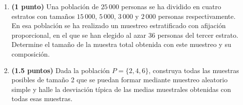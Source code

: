 
\begin{enumerate}[label=\alph*)]
  \item \textbf{(1 punto)} Una población de $25\,000$ personas se ha dividido
  en cuatro estratos con tamaños $15\,000$, $5\,000$, $3\,000$ y $2\,000$
  personas respectivamente. En esa población se ha realizado un muestreo
  estratificado con afijación proporcional, en el que se han elegido al azar
  36 personas del tercer estrato. Determine el tamaño de la muestra total
  obtenida con este muestreo y su composición.
  \item \textbf{(1.5 puntos)} Dada la población $P=\{2,4,6\}$, construya todas
  las muestras posibles de tamaño 2 que se puedan formar mediante muestreo
  aleatorio simple y halle la desviación típica de las medias muestrales
  obtenidas con todas esas muestras.
\end{enumerate}
